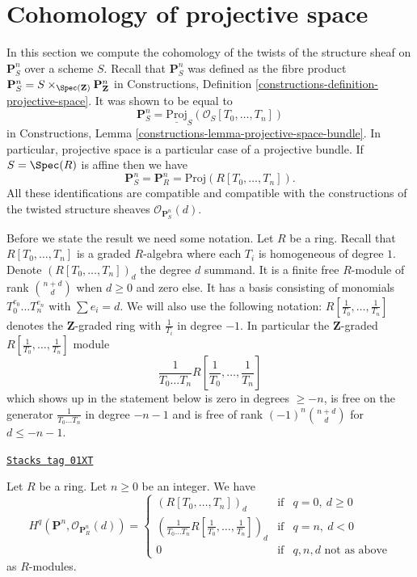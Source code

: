 \section{Cohomology of projective space}
\label{coherent-section-cohomology-projective-space}
In this section we compute the cohomology of the twists of the
structure sheaf on $\mathbf{P}^n_S$ over a scheme $S$.
Recall that $\mathbf{P}^n_S$ was defined as the fibre product
$
\mathbf{P}^n_S = S \times_{\Spec(\mathbf{Z})} \mathbf{P}^n_{\mathbf{Z}}
$
in Constructions, Definition \ref{constructions-definition-projective-space}.
It was shown to be equal to
$$
\mathbf{P}^n_S = \underline{\text{Proj}}_S(\mathcal{O}_S[T_0, \ldots, T_n])
$$
in Constructions, Lemma \ref{constructions-lemma-projective-space-bundle}.
In particular, projective space is a particular case of a projective bundle.
If $S = \Spec(R)$ is affine then we have
$$
\mathbf{P}^n_S = \mathbf{P}^n_R = \text{Proj}(R[T_0, \ldots, T_n]).
$$
All these identifications are compatible and compatible with the constructions
of the twisted structure sheaves $\mathcal{O}_{\mathbf{P}^n_S}(d)$.

\medskip\noindent
Before we state the result we need some notation.
Let $R$ be a ring.
Recall that $R[T_0, \ldots, T_n]$ is a graded
$R$-algebra where each $T_i$ is homogeneous of degree $1$.
Denote $(R[T_0, \ldots, T_n])_d$ the degree $d$ summand.
It is a finite free $R$-module of rank $\binom{n + d}{d}$
when $d \geq 0$ and zero else.
It has a basis consisting of monomials $T_0^{e_0} \ldots T_n^{e_n}$
with $\sum e_i = d$. We will also use the following notation:
$R[\frac{1}{T_0}, \ldots, \frac{1}{T_n}]$ denotes the $\mathbf{Z}$-graded
ring with $\frac{1}{T_i}$ in degree $-1$. In particular the
$\mathbf{Z}$-graded $R[\frac{1}{T_0}, \ldots, \frac{1}{T_n}]$ module
$$
\frac{1}{T_0 \ldots T_n} R[\frac{1}{T_0}, \ldots, \frac{1}{T_n}]
$$
which shows up in the statement below is zero in degrees
$\geq -n$, is free on the generator $\frac{1}{T_0 \ldots T_n}$
in degree $-n - 1$ and is free of rank $(-1)^n\binom{n + d}{d}$ for
$d \leq -n - 1$.

\begin{lemma}
\label{coherent-lemma-cohomology-projective-space-over-ring}
\href{https://stacks.math.columbia.edu/tag/01XT}{\texttt{Stacks tag 01XT}}

\begin{reference}
\cite[III Proposition 2.1.12]{EGA}
\end{reference}
Let $R$ be a ring.
Let $n \geq 0$ be an integer.
We have
$$
H^q(\mathbf{P}^n, \mathcal{O}_{\mathbf{P}^n_R}(d)) =
\left\{
\begin{matrix}
(R[T_0, \ldots, T_n])_d & \text{if} & q = 0,\ d \geq 0 \\
\left(\frac{1}{T_0 \ldots T_n} R[\frac{1}{T_0}, \ldots, \frac{1}{T_n}]\right)_d
& \text{if} & q = n,\ d < 0 \\
0 & \text{if} & q, n, d\text{ not as above}
\end{matrix}
\right.
$$
as $R$-modules.
\end{lemma}

